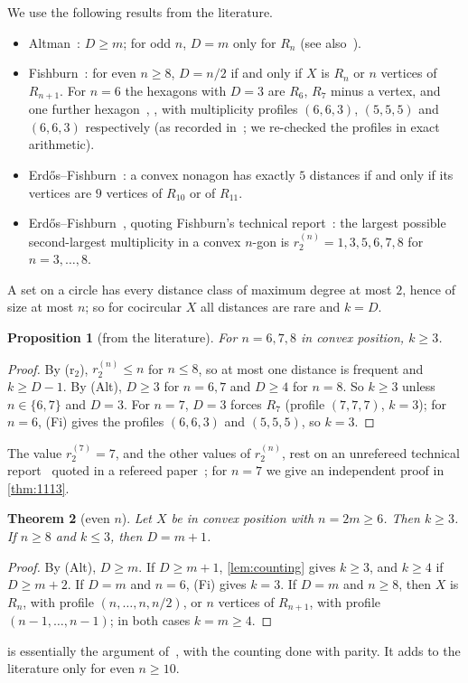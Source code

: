 \documentclass[11pt]{amsart}
\newtheorem{theorem}{Theorem}[section]
\newtheorem{proposition}[theorem]{Proposition}
\theoremstyle{definition}
\theoremstyle{remark}
\begin{document}
We use the following results from the literature.
\begin{itemize}[leftmargin=2em]
\item[(Alt)] Altman~\cite{Alt63,Alt72}: $D\ge m$; for odd $n$, $D=m$ only for $R_n$ (see also~\cite[Theorem~1]{Fi95}).
\item[(Fi)] Fishburn~\cite{Fi95}: for even $n\ge8$, $D=n/2$ if and only if $X$ is $R_n$ or $n$ vertices of $R_{n+1}$. For $n=6$ the hexagons with $D=3$ are $R_6$, $R_7$ minus a vertex, and one further hexagon~\cite[Theorem~2]{Fi95}, \cite{EF95b}, with multiplicity profiles $(6,6,3)$, $(5,5,5)$ and $(6,6,3)$ respectively (as recorded in~\cite[\S2]{CDL25}; we re-checked the profiles in exact arithmetic).
\item[(EF96)] Erd\H{o}s--Fishburn~\cite{EF96}: a convex nonagon has exactly $5$ distances if and only if its vertices are $9$ vertices of $R_{10}$ or of $R_{11}$.
\item[(r$_2$)] Erd\H{o}s--Fishburn~\cite[\S3]{EF95b}, quoting Fishburn's technical report~\cite{Fi92}: the largest possible second-largest multiplicity in a convex $n$-gon is $r_2^{(n)}=1,3,5,6,7,8$ for $n=3,\dots,8$.
\end{itemize}
A set on a circle has every distance class of maximum degree at most $2$, hence of size at most $n$; so for cocircular $X$ all distances are rare and $k=D$.

\begin{proposition}[from the literature]\label{prop:lit678}
For $n=6,7,8$ in convex position, $k\ge3$.
\end{proposition}
\begin{proof}
By (r$_2$), $r_2^{(n)}\le n$ for $n\le8$, so at most one distance is frequent and $k\ge D-1$. By (Alt), $D\ge3$ for $n=6,7$ and $D\ge4$ for $n=8$. So $k\ge3$ unless $n\in\{6,7\}$ and $D=3$. For $n=7$, $D=3$ forces $R_7$ (profile $(7,7,7)$, $k=3$); for $n=6$, (Fi) gives the profiles $(6,6,3)$ and $(5,5,5)$, so $k=3$.
\end{proof}
The value $r_2^{(7)}=7$, and the other values of $r_2^{(n)}$, rest on an unrefereed technical report~\cite{Fi92} quoted in a refereed paper~\cite{EF95b}; for $n=7$ we give an independent proof in \cref{thm:1113}.

\begin{theorem}[even $n$]\label{thm:even}
Let $X$ be in convex position with $n=2m\ge6$. Then $k\ge3$. If $n\ge8$ and $k\le3$, then $D=m+1$.
\end{theorem}
\begin{proof}
By (Alt), $D\ge m$. If $D\ge m+1$, \cref{lem:counting} gives $k\ge3$, and $k\ge4$ if $D\ge m+2$. If $D=m$ and $n=6$, (Fi) gives $k=3$. If $D=m$ and $n\ge8$, then $X$ is $R_n$, with profile $(n,\dots,n,n/2)$, or $n$ vertices of $R_{n+1}$, with profile $(n-1,\dots,n-1)$; in both cases $k=m\ge4$.
\end{proof}
 is essentially the argument of~\cite[Theorem~1.2]{CDL25}, with the counting done with parity. It adds to the literature only for even $n\ge10$.
\end{document}
